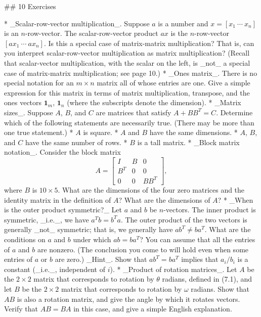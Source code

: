 

## 10 Exercises

* _Scalar-row-vector multiplication_. Suppose \(a\) is a number and \(x=[x_{1}\ \cdots\ x_{n}]\) is an \(n\)-row-vector. The scalar-row-vector product \(ax\) is the \(n\)-row-vector \([ax_{1}\ \cdots\ ax_{n}]\). Is this a special case of matrix-matrix multiplication? That is, can you interpret scalar-row-vector multiplication as matrix multiplication? (Recall that scalar-vector multiplication, with the scalar on the left, is _not_ a special case of matrix-matrix multiplication; see page 10.)
* _Ones matrix_. There is no special notation for an \(m\times n\) matrix all of whose entries are one. Give a simple expression for this matrix in terms of matrix multiplication, transpose, and the ones vectors \(\mathbf{1}_{m}\), \(\mathbf{1}_{n}\) (where the subscripts denote the dimension).
* _Matrix sizes_. Suppose \(A\), \(B\), and \(C\) are matrices that satisfy \(A+BB^{T}=C\). Determine which of the following statements are necessarily true. (There may be more than one true statement.)
* \(A\) is square.
* \(A\) and \(B\) have the same dimensions.
* \(A\), \(B\), and \(C\) have the same number of rows.
* \(B\) is a tall matrix.
* _Block matrix notation_. Consider the block matrix \[A=\left[\begin{array}{ccc}I&B&0\\ B^{T}&0&0\\ 0&0&BB^{T}\end{array}\right],\] where \(B\) is \(10\times 5\). What are the dimensions of the four zero matrices and the identity matrix in the definition of \(A\)? What are the dimensions of \(A\)?
* _When is the outer product symmetric?_ Let \(a\) and \(b\) be \(n\)-vectors. The inner product is symmetric, _i.e._, we have \(a^{T}b=b^{T}a\). The outer product of the two vectors is generally _not_ symmetric; that is, we generally have \(ab^{T}\neq ba^{T}\). What are the conditions on \(a\) and \(b\) under which \(ab=ba^{T}\)? You can assume that all the entries of \(a\) and \(b\) are nonzero. (The conclusion you come to will hold even when some entries of \(a\) or \(b\) are zero.) _Hint_. Show that \(ab^{T}=ba^{T}\) implies that \(a_{i}/b_{i}\) is a constant (_i.e._, independent of \(i\)).
* _Product of rotation matrices_. Let \(A\) be the \(2\times 2\) matrix that corresponds to rotation by \(\theta\) radians, defined in (7.1), and let \(B\) be the \(2\times 2\) matrix that corresponds to rotation by \(\omega\) radians. Show that \(AB\) is also a rotation matrix, and give the angle by which it rotates vectors. Verify that \(AB=BA\) in this case, and give a simple English explanation.
